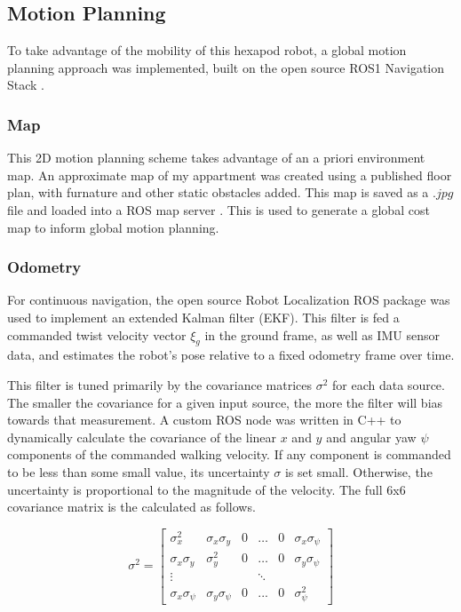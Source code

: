 \subsection{ Motion Planning }

To take advantage of the mobility of this hexapod robot, a global motion planning approach was implemented, built on the open source ROS1 Navigation Stack \cite{navstack}.

\subsubsection{ Map }
This 2D motion planning scheme takes advantage of an a priori environment map. An approximate map of my appartment was created using a published floor plan, with furnature and other static obstacles added. This map is saved as a $.jpg$ file and loaded into a ROS map server \cite{mapserver}. This is used to generate a global cost map to inform global motion planning.

\subsubsection{ Odometry }
For continuous navigation, the open source Robot Localization ROS package \cite{robotlocalization} was used to implement an extended Kalman filter (EKF). This filter is fed a commanded twist velocity vector $\xi_g$ in the ground frame, as well as IMU sensor data, and estimates the robot's pose relative to a fixed odometry frame over time.

This filter is tuned primarily by the covariance matrices $\sigma^2$ for each data source. The smaller the covariance for a given input source, the more the filter will bias towards that measurement. A custom ROS node was written in C++ to dynamically calculate the covariance of the linear $x$ and $y$ and angular yaw $\psi$ components of the commanded walking velocity. If any component is commanded to be less than some small value, its uncertainty $\sigma$ is set small. Otherwise, the uncertainty is proportional to the magnitude of the velocity. The full 6x6 covariance matrix is the calculated as follows.

\begin{equation}
    \sigma^2 =
    \begin{bmatrix}
        \sigma_x^2 & \sigma_x \sigma_y & 0 & \ldots & 0 & \sigma_x \sigma_{\psi} \\
        \sigma_x \sigma_y & \sigma_y^2 & 0 & \ldots & 0 & \sigma_y \sigma_{\psi} \\
        \vdots &  &  & \ddots &  &  \\
        \sigma_x \sigma_{\psi} & \sigma_y \sigma_{\psi} & 0 & ... & 0 & \sigma_{\psi}^2
    \end{bmatrix}
\end{equation}

